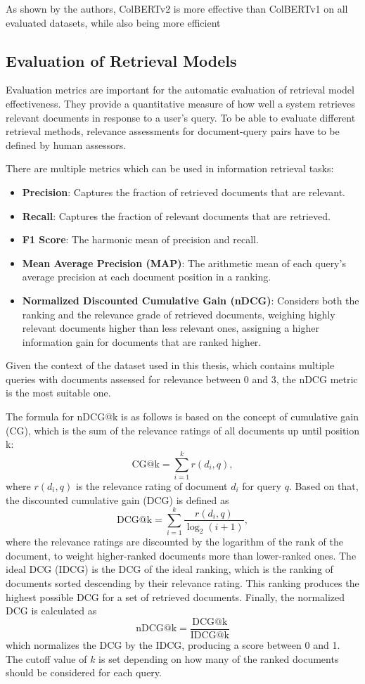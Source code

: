 As shown by the authors, ColBERTv2 is more effective than ColBERTv1 on all evaluated datasets, while also being more efficient

\subsection{Evaluation of Retrieval Models}\label{sec:evaluation-of-retrieval-models}
Evaluation metrics are important for the automatic evaluation of retrieval model effectiveness.
They provide a quantitative measure of how well a system retrieves relevant documents in response to a user's query.
To be able to evaluate different retrieval methods, relevance assessments for document-query pairs have to be defined by human assessors.

There are multiple metrics which can be used in information retrieval tasks:
\begin{itemize}
    \item \textbf{Precision}: Captures the fraction of retrieved documents that are relevant.
    \item \textbf{Recall}: Captures the fraction of relevant documents that are retrieved.
    \item \textbf{F1 Score}: The harmonic mean of precision and recall.
    \item \textbf{Mean Average Precision (MAP)}: The arithmetic mean of each query's average precision at each document position in a ranking.
    \item \textbf{Normalized Discounted Cumulative Gain (nDCG)}: Considers both the ranking and the relevance grade of retrieved documents, weighing highly relevant documents higher than less relevant ones, assigning a higher information gain for documents that are ranked higher.
\end{itemize}
Given the context of the dataset used in this thesis, which contains multiple queries with documents assessed for relevance between 0 and 3, the nDCG metric is the most suitable one.

The formula for nDCG@k is as follows is based on the concept of cumulative gain (CG), which is the sum of the relevance ratings of all documents up until position k:
\[ \text{CG@k} = \sum_{i=1}^{k} r(d_i,q) ,\]
where $r(d_i,q)$ is the relevance rating of document $d_i$ for query $q$.
Based on that, the discounted cumulative gain (DCG) is defined as
\[ \text{DCG@k} = \sum_{i=1}^{k} \frac{r(d_i,q)}{\log_2(i+1)} ,\]
where the relevance ratings are discounted by the logarithm of the rank of the document, to weight higher-ranked documents more than lower-ranked ones.
The ideal DCG (IDCG) is the DCG of the ideal ranking, which is the ranking of documents sorted descending by their relevance rating.
This ranking produces the highest possible DCG for a set of retrieved documents.
Finally, the normalized DCG is calculated as
\[ \text{nDCG@k} = \frac{\text{DCG@k}}{\text{IDCG@k}} \]
which normalizes the DCG by the IDCG, producing a score between 0 and 1.
The cutoff value of $k$ is set depending on how many of the ranked documents should be considered for each query.

